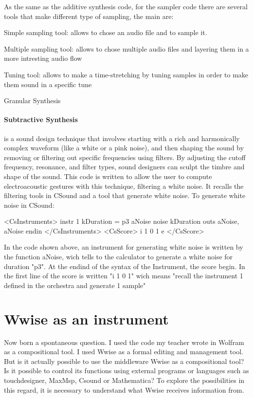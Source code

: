 		As the same as the additive synthesis code, for the sampler code there are several tools that make different type of sampling, the main are:
		
			\begin{compactitem}
				\item Simple sampling tool: allows to chose an audio file and to sample it.
				\item Multiple sampling tool: allows to chose multiple audio files and layering them in a more intresting audio flow
				\item Tuning tool: allows to make a time-stretching by tuning samples in order to make them sound in a specific tune
				\item Granular Synthesis
			\end{compactitem}
		
		\paragraph{Subtractive Synthesis} is a sound design technique that involves starting with a rich and harmonically complex waveform (like a white or a pink noise), and then shaping the sound by removing or filtering out specific frequencies using filters. By adjusting the cutoff frequency, resonance, and filter types, sound designers can sculpt the timbre and shape of the sound.
		This code is written to allow the user to compute electroacoustic gestures with this technique, filtering a white noise. It recalls the filtering tools in CSound and a tool that generate white noise. To generate white noise in CSound:
		
		\newpage
		
		\begin{code}
			<CsInstruments>
			instr 1
			kDuration = p3
			aNoise    noise kDuration
			outs aNoise, aNoise
			endin
			</CsInstruments>
			<CsScore>
			i 1 0 1
			e
			</CsScore>
		\end{code}
		
		In the code shown above, an instrument for generating white noise is written by the function aNoise, wich tells to the calculator to generate a white noise for duration "p3". At the endind of the syntax of the Instrument, the score begin. In the first line of the score is written "i 1 0 1" wich means "recall the instrument 1 defined in the orchestra and generate 1 sample"
		
	\section{Wwise as an instrument}
	Now born a spontaneous question. I used the code my teacher wrote in Wolfram as a compositional tool. I used Wwise as a formal editing and management tool.
	But is it actually possible to use the middleware Wwise as a compositional tool? Is it possible to control its functions using external programs or languages such as touchdesigner, MaxMsp, Csound or Mathematica?
	To explore the possibilities in this regard, it is necessary to understand what Wwise receives information from.
	

